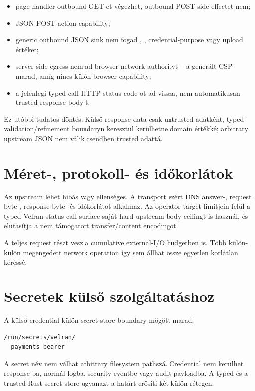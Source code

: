 \begin{itemize}
  \item page handler outbound GET-et végezhet, outbound POST side effectet nem;
  \item JSON POST action capability;
  \item generic outbound JSON sink nem fogad , , credential-purpose vagy upload értéket;
  \item server-side egress nem ad browser network authorityt -- a generált CSP  marad, amíg nincs külön browser capability;
  \item a jelenlegi typed call HTTP status code-ot ad vissza, nem automatikusan trusted response body-t.
\end{itemize}

Ez utóbbi tudatos döntés. Külső response data csak untrusted adatként, typed validation/refinement boundaryn keresztül kerülhetne domain értékké; arbitrary upstream JSON nem válik csendben trusted adattá.

\section{Méret-, protokoll- és időkorlátok}

Az upstream lehet hibás vagy ellenséges. A transport ezért DNS answer-, request byte-, response byte- és időkorlátot alkalmaz. Az operator target limitjein felül a typed Velran status-call surface saját hard upstream-body ceilingt is használ, és elutasítja a nem támogatott transfer/content encodingot.

A teljes request részt vesz a cumulative external-I/O budgetben is. Több külön-külön megengedett network operation így sem állhat össze egyetlen korlátlan kéréssé.

\section{Secretek külső szolgáltatáshoz}

A külső credential külön secret-store boundary mögött marad:

\begin{lstlisting}
/run/secrets/velran/
  payments-bearer
\end{lstlisting}

A secret név nem válhat arbitrary filesystem pathszá. Credential nem kerülhet response-ba, normál logba, security eventbe vagy audit payloadba. A typed  és a trusted Rust secret store ugyanazt a határt erősíti két külön rétegen.

